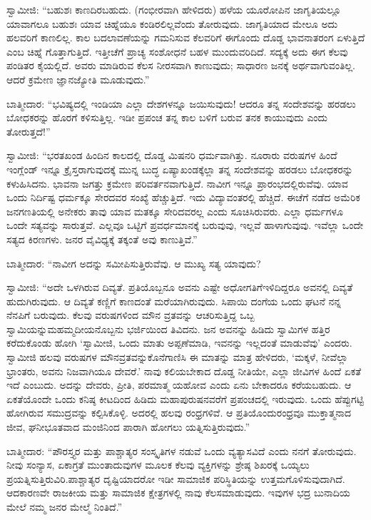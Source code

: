 ಸ್ವಾಮೀಜಿ: “ಬಹುಶಃ ಕಾಣದಿರಬಹುದು. (ಗಂಭೀರವಾಗಿ ಹೇಳಿದರು) ಹಳೆಯ ಯೂರೋಪಿನ ಜಾಗೃತಿಯಲ್ಲೂ ಯಾವಾಗಲೂ ಬಹುಶಃ ಯಾವ ಚಿಹ್ನೆಯೂ ಕಂಡಿರಲಿಲ್ಲ\-ವೆಂದು ತೋರುವುದು. ಜಾಗೃತಿಯಾದ ಮೇಲೂ ಅದು ಹಲವರಿಗೆ ಕಾಣಲಿಲ್ಲ. ಕಾಲ ಬದಲಾವಣೆಯನ್ನು ಗಮನಿಸುವ ಕೆಲವರಿಗೆ ಈಗೊಂದು ದೊಡ್ಡ ಭಾವನಾತರಂಗ ಏಳುತ್ತಿದೆ ಎಂಬ ಚಿಹ್ನೆ ಗೊತ್ತಾಗುತ್ತಿದೆ. ಇತ್ತೀಚೆಗೆ ಪ್ರಾಚ್ಯ ಸಂಶೋಧನೆ ಬಹಳ ಮುಂದುವರಿದಿದೆ. ಸದ್ಯಕ್ಕೆ ಅದು ಈಗ ಕೆಲವು ಪಂಡಿತರ ಕೈಯಲ್ಲಿದೆ. ಅವರು ಮಾಡಿರುವ ಕೆಲಸ ನೀರಸವಾಗಿ ಕಾಣುವುದು; ಸಾಧಾರಣ ಜನಕ್ಕೆ ಅರ್ಥವಾಗುವಂತಿಲ್ಲ. ಆದರೆ ಕ್ರಮೇಣ ಜ್ಞಾನಜ್ಯೋತಿ ಮೂಡುವುದು.”

ಬಾತ್ಮೀದಾರ: “ಭವಿಷ್ಯದಲ್ಲಿ ಇಂಡಿಯಾ ಎಲ್ಲಾ ದೇಶಗಳನ್ನೂ ಜಯಿಸುವುದು! ಆದರೂ ತನ್ನ ಸಂದೇಶವನ್ನು ಹರಡಲು ಬೋಧಕರನ್ನು ಹೊರಗೆ ಕಳಿಸುತ್ತಿಲ್ಲ. ಇಡೀ ಪ್ರಪಂಚ ತನ್ನ ಕಾಲ ಬಳಿಗೆ ಬರುವ ತನಕ ಕಾಯುವುದು ಎಂದು ತೋರುತ್ತದೆ!”

ಸ್ವಾಮೀಜಿ: “ಭರತಖಂಡ ಹಿಂದಿನ ಕಾಲದಲ್ಲಿ ದೊಡ್ಡ ಮಿಷನರಿ ಧರ್ಮವಾಗಿತ್ತು. ನೂರಾರು ವರುಷಗಳ ಹಿಂದೆ ಇಂಗ್ಲೆಂಡ್​ ಇನ್ನೂ ಕ್ರೈಸ್ತರಾಗುವುದಕ್ಕೆ ಮುನ್ನ ಬುದ್ಧ ಏಷ್ಯಾಖಂಡಕ್ಕೆಲ್ಲಾ ತನ್ನ ಸಂದೇಶವನ್ನು ಹರಡಲು ಬೋಧಕರನ್ನು ಕಳುಹಿಸಿದನು. ಭಾವನಾ ಜಗತ್ತು ಕ್ರಮೇಣ ಪರಿವರ್ತನವಾಗುತ್ತಿದೆ. ನಾವೀಗ ಇನ್ನೂ ಪ್ರಾರಂಭದಲ್ಲಿರುವೆವು. ಯಾವ ಒಂದು ನಿರ್ದಿಷ್ಟ ಧರ್ಮಕ್ಕೂ ಸೇರದವರ ಸಂಖ್ಯೆ ಹೆಚ್ಚುತ್ತಿದೆ. ಇದು ವಿದ್ಯಾವಂತರಲ್ಲಿ ಹೆಚ್ಚಿದೆ. ಈಚೆಗೆ ನಡೆದ ಅಮೆರಿಕ ಜನಗಣತಿಯಲ್ಲಿ ಅನೇಕರು ತಾವು ಯಾವ ಮತಕ್ಕೂ ಸೇರಿದವರಲ್ಲ ಎಂದು ಸೂಚಿಸಿರುವರು. ಎಲ್ಲಾ ಧರ್ಮಗಳೂ ಒಂದೇ ಸತ್ಯವನ್ನು ಸಾರುತ್ತವೆ. ಎಲ್ಲವೂ ಒಟ್ಟಿಗೆ ಪ್ರವರ್ಧಮಾನಕ್ಕೆ ಬರುವುವು, ಇಲ್ಲವೆ ಹಾಳಾಗುವುವು. ಇವೆಲ್ಲಾ ಒಂದೇ ಸತ್ಯದ ಕಿರಣಗಳು. ಜನರ ವೈವಿಧ್ಯಕ್ಕೆ ತಕ್ಕಂತೆ ಅವು ಕಾಣುತ್ತಿವೆ.”

ಬಾತ್ಮೀದಾರ: “ನಾವೀಗ ಅದನ್ನು ಸಮೀಪಿಸುತ್ತಿರುವೆವು. ಆ ಮುಖ್ಯ ಸತ್ಯ ಯಾವುದು?

ಸ್ವಾಮೀಜಿ: “ಅದೇ ಒಳಗಿರುವ ದಿವ್ಯತೆ. ಪ್ರತಿಯೊಬ್ಬನೂ ಅವನು ಎಷ್ಟೇ ಅಧೋಗತಿಗೆ\break ಇಳಿದಿದ್ದರೂ ಅವನಲ್ಲಿ ದಿವ್ಯತೆ ಹುದುಗಿರುವುದು. ಆ ದಿವ್ಯತೆ ಕಣ್ಣಿಗೆ ಕಾಣದಂತೆ ಮರೆಯಾಗಿರು\-ವುದು. ಸಿಪಾಯಿ ದಂಗೆಯ ಒಂದು ಘಟನೆ ನನ್ನ ನೆನಪಿಗೆ ಬರುವುದು. ಕೆಲವು ವರುಷಗಳಿಂದ ಮೌನ ವ್ರತವನ್ನು ಆಚರಿಸುತ್ತಿದ್ದ ಒಬ್ಬ ಸ್ವಾಮಿಯನ್ನು\break ಮಹಮ್ಮದೀಯನೊಬ್ಬನು ಭರ್ಜಿಯಿಂದ ತಿವಿದನು. ಜನ ಅವನನ್ನು ಹಿಡಿದು ಸ್ವಾಮಿಗಳ ಹತ್ತಿರ ಕರೆದುಕೊಂಡು ಹೋಗಿ ‘ಸ್ವಾಮೀಜಿ, ಒಂದು ಮಾತು ಅಪ್ಪಣೆಮಾಡಿ, ಇವನನ್ನು ಇಲ್ಲದಂತೆ ಮಾಡುವೆವು’ ಎಂದರು. ಸ್ವಾಮೀಜಿ ಹಲವು ವರುಷಗಳ ಮೌನವ್ರತವನ್ನು\break ಕೊನೆಗಾಣಿಸಿ ಈ ಮಾತನ್ನು ಮಾತ್ರ ಹೇಳಿದರು, ‘ಮಕ್ಕಳೆ, ನೀವೆಲ್ಲಾ ಭ್ರಾಂತರು, ಅವನು ನಿಜವಾಗಿಯೂ ದೇವರೆ.’ ನಾವು ಕಲಿಯಬೇಕಾದ ದೊಡ್ಡ ನೀತಿಯೇ, ಎಲ್ಲಾ ಜೀವಿಗಳ ಹಿಂದೆ ಏಕತೆ ಇದೆ ಎಂಬುದು. ಅದನ್ನು ದೇವರು, ಪ್ರೀತಿ, ಪರಮಾತ್ಮ ಯಹೋವ ಎಂದು ಏನು ಬೇಕಾದರೂ ಕರೆಯಬಹುದು. ಆ ಏಕತೆಯೊಂದೇ ಒಂದು ಕನಿಷ್ಠ ಕೀಟದಿಂದ ಹಿಡಿದು ಮಹಾಪುರುಷನವರೆಗೆ ಪ್ರಪಂಚದಲ್ಲಿ ಇರುವುದು. ಒಂದು ಹೆಪ್ಪುಗಟ್ಟಿ ಹೋಗಿ\-ರುವ ಸಮುದ್ರವನ್ನು ಕಲ್ಪಿಸಿಕೊಳ್ಳಿ. ಅದರಲ್ಲಿ ಹಲವು ರಂಧ್ರಗಳಿವೆ. ಆ ಪ್ರತಿಯೊಂದು\break ರಂಧ್ರವೂ ಮುಕ್ತಾತ್ಮನಾದ ಜೀವ, ಘನೀಭೂತವಾದ ಮಂಜಿನಿಂದ ಪಾರಾಗಿ ಹೋಗಲು ಯತ್ನಿಸುತ್ತಿರುವುದು.”

ಬಾತ್ಮೀದಾರ: “ಪೌರಸ್ತ್ಯರ ಮತ್ತು ಪಾಶ್ಚಾತ್ಯರ ಸಂಸ್ಕೃತಿಗಳ ನಡುವೆ ಒಂದು ವ್ಯತ್ಯಾಸವಿದೆ ಎಂದು ನನಗೆ ತೋರುವುದು. ನೀವು ಸಂನ್ಯಾಸ, ಏಕಾಗ್ರತೆ ಮುಂತಾದುವುಗಳ ಮೂಲಕ ಕೆಲವು ವ್ಯಕ್ತಿಗಳನ್ನು ಶ್ರೇಷ್ಠ ಶಿಖರಕ್ಕೆ ಒಯ್ಯಲು ಪ್ರಯತ್ನಿಸುತ್ತಿರುವಿರಿ.\break ಪಾಶ್ಚಾತ್ಯರ ದೃಷ್ಟಿಯಾದರೋ ಇಡೀ ಸಾಮಾಜಿಕ ಪರಿಸ್ಥಿತಿಯನ್ನು ಉತ್ತಮಗೊಳಿಸುವುದಾಗಿದೆ. ಆದಕಾರಣವೇ ರಾಜಕೀಯ ಮತ್ತು ಸಾಮಾಜಿಕ ಕ್ಷೇತ್ರಗಳಲ್ಲಿ ನಾವು ಕೆಲಸ\break ಮಾಡುವುದು. ಇವುಗಳ ಭದ್ರ ಬುನಾದಿಯ ಮೇಲೆ ನಮ್ಮ ಜನರ ಮೇಲ್ಮೆ ನಿಂತಿದೆ.”

